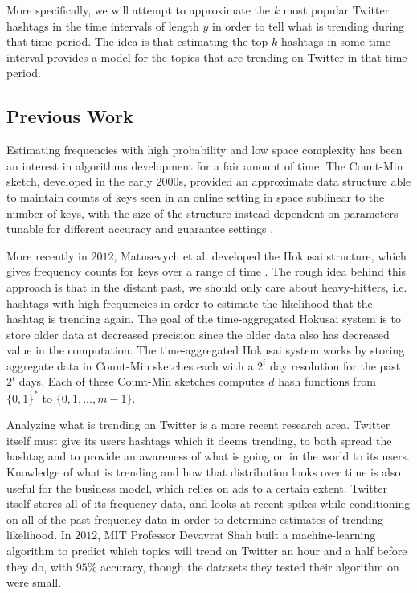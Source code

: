 \documentclass[twoside]{article}
\newcommand{\cc}[1]
 {\textbf{\cite{#1}}}
\begin{document}
More specifically, we will attempt to approximate the $k$ most popular Twitter hashtags in the time intervals of length $y$ in order to tell what is trending during that time period.
The idea is that estimating the top $k$ hashtags in some time interval provides a model for the topics that are trending on Twitter in that time period.


\subsection{Previous Work} \label{sec:PreviousWork}

Estimating frequencies with high probability and low space complexity has been an interest in
algorithms development for a fair amount of time. The Count-Min sketch, developed in the early $2000$s,
provided an approximate data structure able to maintain counts of keys seen in an online setting in space sublinear to the number of keys, with the size of the structure instead dependent on parameters tunable for different accuracy and guarantee settings \cc{Cormode:2005}.

More recently in $2012$, Matusevych et al. developed the Hokusai structure, which gives frequency counts for keys over a range of time \cc{Matusevych:2012}. The rough idea behind this approach is that in the distant past, we should only care about heavy-hitters, i.e. hashtags with high frequencies in order to estimate the likelihood that the hashtag is trending again. The goal of the time-aggregated Hokusai system is to store older data at decreased precision since the older data also has decreased value in the computation.  The time-aggregated Hokusai system works by storing aggregate data in Count-Min sketches each with a $2^i$ day resolution for the past $2^i$ days.  Each of these Count-Min sketches computes $d$ hash functions from $\{0,1\}^*$ to $\{0, 1, ..., m-1\}$.


Analyzing what is trending on Twitter is a more recent research area. Twitter itself must give its users hashtags which it deems trending, to both spread the hashtag and to provide an awareness of what is going on in the world to its users. Knowledge of what is trending and how that distribution looks over time is also useful for the business model, which relies on ads to a certain extent.
Twitter itself stores all of its frequency data, and looks at recent spikes while conditioning on all of the past frequency data in order to determine estimates of trending likelihood.
In $2012$, MIT Professor Devavrat Shah built a machine-learning algorithm to predict which topics will trend on Twitter an hour and a half before they do, with $95\%$ accuracy, though the datasets they tested their algorithm on were small\cc{MITNews2012}. 
\end{document}
